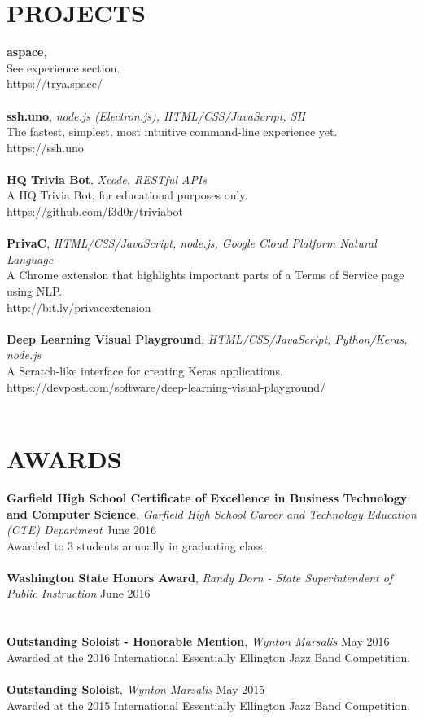 \documentclass[line,margin]{res}
\begin{document}
\begin{resume}
	\section{PROJECTS}
	\textbf{aspace}, {\sl }\\ See experience section.\\ https://trya.space/\\\\
	\textbf{ssh.uno}, {\sl node.js (Electron.js), HTML/CSS/JavaScript, SH}\\ The fastest, simplest, most intuitive command-line experience yet.\\ https://ssh.uno\\\\
	\textbf{HQ Trivia Bot}, {\sl Xcode, RESTful APIs}\\ A HQ Trivia Bot, for educational purposes only.\\ https://github.com/f3d0r/triviabot\\\\
	\textbf{PrivaC}, {\sl HTML/CSS/JavaScript, node.js, Google Cloud Platform Natural Language}\\ A Chrome extension that highlights important parts of a Terms of Service page using NLP.\\ http://bit.ly/privacextension\\\\
	\textbf{Deep Learning Visual Playground}, {\sl HTML/CSS/JavaScript, Python/Keras, node.js}\\ A Scratch-like interface for creating Keras applications.\\ https://devpost.com/software/deep-learning-visual-playground/\\\\
	\section{AWARDS}
	\textbf{Garfield High School Certificate of Excellence in Business Technology and Computer Science}, {\sl Garfield High School Career and Technology Education (CTE) Department} \hfill June 2016 \\
	Awarded to 3 students annually in graduating class. \\\\
	\textbf{Washington State Honors Award}, {\sl Randy Dorn - State Superintendent of Public Instruction} \hfill June 2016 \\
	\\\\
	\textbf{Outstanding Soloist - Honorable Mention}, {\sl Wynton Marsalis} \hfill May 2016 \\
	Awarded at the 2016 International Essentially Ellington Jazz Band Competition. \\\\
	\textbf{Outstanding Soloist}, {\sl Wynton Marsalis} \hfill May 2015 \\
	Awarded at the 2015 International Essentially Ellington Jazz Band Competition. \\\\
	\ 
\end{resume}
\end{document}
